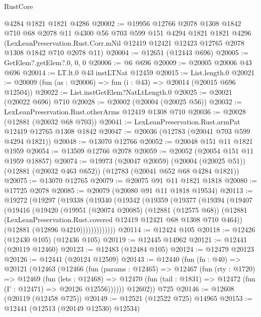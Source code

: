 \begin{lexlean}{RustCore}
\begin{coremodule}
    @4284
    @1821
    @1821
    @4286
@20002 := @19956
    @12766
    @2078
    @1308
    @1842
    @710
    @68
    @2078
    @11
    @4300
    @56
    @703
    @599
    @151
    @4294
    @1821
    @1821
    @4296
    (LexLeanPreservation.Rust.Corr.mNil
      @12419
      @12421
      @12423
      @12765
      @2078
      @1308
      @1842
      @710
      @2078
      @11)
@20004 := @12651 (@12443 @696)
@20005 := GetElem?.getElem?.{0, 0, 0}
@20006 := @6 @696
@20009 := @20005 @20006 @43 @696
@20014 := LT.lt.{0} @43 instLTNat @12459
@20015 := List.length.{0}
@20021 := @20009 (fun (as : @20006) => fun (i : @43) => @20014 (@20015 @696 @12504))
@20022 := List.instGetElem?NatLtLength.{0}
@20025 := @20021 (@20022 @696) @710
@20028 := @20002 (@20004 (@20025 @56))
@20032 := LexLeanPreservation.Rust.otherArms @12419 @1308 @710
@20036 := @20028 (@12881 (@20032 @68 @703))
@20041 := LexLeanPreservation.Rust.armPat @12419 @12765 @1308 @1842
@20047 := @20036 (@12783 (@20041 @703 @599 @4294 @1821))
@20048 := @13070 @12766
@20052 := @20048 @151 @11 @1821 @1959
@20054 := @13509 @12766 @2078
@20059 := @20052 (@20054 @151 @11 @1959 @18857)
@20074 := @19973
    (@20047 @20059)
    (@20004 (@20025 @51))
    (@12881 (@20032 @463 @652))
    (@12783 (@20041 @652 @68 @4284 @1821))
@20075 := @13070 @12765
@20079 := @20075 @91 @11 @1821 @1818
@20080 := @17725 @2078
@20085 := @20079 (@20080 @91 @11 @1818 @19534)
@20113 := @19272
    (@19297
      (@19338
        (@19340
          (@19342
            (@19359
              (@19377
                (@19394
                  (@19407
                    (@19416
                      (@19420
                        (@19951
                          (@20074 @20085)
                          (@12881 (@12575 @68))
                          (@12881
                            (LexLeanPreservation.Rust.covered @12419 @12421 @68 @1308 @710 @464))
                          (@12881 (@12896 @4210)))))))))))))
@20114 := @12424 @105
@20118 := @12426 (@12430 @105) (@12436 @105)
@20119 := @12445 @14962
@20121 := @12441 (@20119 @12460)
@20123 := @12483 (@12484 @105)
@20124 := @12479 @20123
@20126 := @12441 (@20124 @12509)
@20143 := @12440
    (fun (fn : @40) =>
    @20121
      (@12463
        (@12466
          (fun (params : @12465) =>
          @12467
            (fun (rty : @1720) =>
            @12469
              (fun (lets : @12468) =>
              @12470 (fun (tail : @1831) => @12472 (fun (Γ : @12471) => @20126 @12556))))))
        @12602))
    @725
@20146 := @12608 (@20119 (@12458 @725))
@20149 := @12521 (@12522 @725) @14965
@20153 := @12441 (@12513 (@20149 @12530) @12534)

\end{coremodule}
\end{lexlean}
